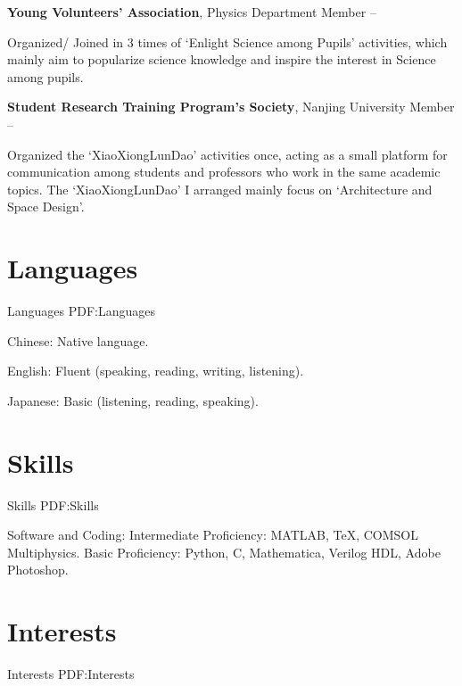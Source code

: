 \documentclass[letterpaper,MMMyyyy,nonstop]{simpleresumecv}
\begin{document}
\begin{body}
\textbf{Young Volunteers' Association},
Physics Department
\BulletItem
Member
\hfill
{} --
\begin{detail}
\SubBulletItem
Organized/ Joined in 3 times of `Enlight Science among Pupils' activities, which mainly aim to popularize science knowledge and inspire the interest in Science among pupils.
\end{detail}

\textbf{Student Research Training Program's Society},
Nanjing University
\BulletItem
Member
\hfill
{} --
\begin{detail}
\SubBulletItem
Organized the `XiaoXiongLunDao' activities once, acting as a small platform for communication among students and professors who work in the same academic topics. The `XiaoXiongLunDao' I arranged mainly focus on `Architecture and Space Design'.
\end{detail}



\section
{Languages}
{Languages}
{PDF:Languages}

\BulletItem
Chinese: Native language.

\GapNoBreak
\BulletItem
English: Fluent (speaking, reading, writing, listening).

\GapNoBreak
\BulletItem
Japanese: Basic (listening, reading, speaking).


\section
{Skills}
{Skills}
{PDF:Skills}

\BulletItem Software and Coding:
\SubBulletItem Intermediate Proficiency: MATLAB, {\TeX}, COMSOL Multiphysics.
\SubBulletItem Basic Proficiency: Python, C, Mathematica, Verilog HDL,  Adobe Photoshop.



\section
{Interests}
{Interests}
{PDF:Interests}


\end{body}
\end{document}
